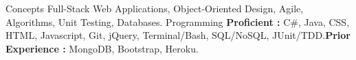 \vspace{-2mm}
\begin{cvskills}
    \vspace{1.5mm}\cvskill
    {Concepts}
    {Full-Stack Web Applications, Object-Oriented Design, Agile, Algorithms, Unit Testing, Databases.}
\cvskill
     {Programming }
    {\textbf{Proficient :} C\#, Java, CSS, HTML, Javascript, Git, jQuery, Terminal/Bash, SQL/NoSQL, JUnit/TDD.\newline \textbf{Prior Experience :} MongoDB, Bootstrap, Heroku.  }    
\end{cvskills}
